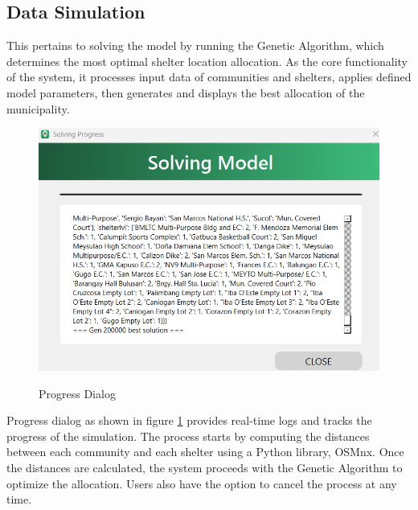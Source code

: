 \documentclass[12pt,a4paper,]{article}
\begin{document}
	
	\subsection{Data Simulation}
	This pertains to solving the model by running the Genetic Algorithm, which determines the most optimal shelter location allocation. As the core functionality of the system, it processes input data of communities and shelters, applies defined model parameters, then generates and displays the best allocation of the municipality.
	
	\begin{figure}[h!]
		\caption{Progress Dialog}
		\centering
		\includegraphics[width=\columnwidth]{Chapter 4/progress}
		\label{solveProg}
	\end{figure}
	Progress dialog as shown in figure \ref{solveProg} provides real-time logs and tracks the progress of the simulation. The process starts by computing the distances between each community and each shelter using a Python library, OSMnx. Once the distances are calculated, the system proceeds with the Genetic Algorithm to optimize the allocation. Users also have the option to cancel the process at any time.
	
\end{document}
